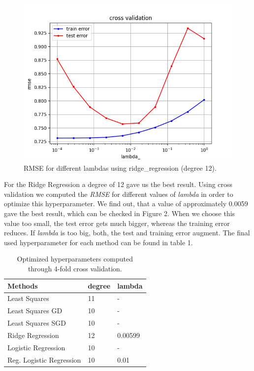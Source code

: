 \documentclass[10pt,conference,compsocconf]{IEEEtran}
\begin{document}
\begin{figure}[htbp]
	\centering
	\includegraphics[width=\columnwidth]{cross_validation_ridge_degree_12.png}
	\caption{RMSE for different lambdas using ridge\_regression (degree 12).}
	\vspace{-3mm}
	\label{fig:crossvalidationridge}
\end{figure}
 For the Ridge Regression a degree of 12 gave us the best result. Using cross validation we computed the \textit{RMSE} for different values of \textit{lambda} in order to optimize this hyperparameter. We find out, that a value of approximately 0.0059 gave the best result, which can be checked in Figure 2. When we choose this value too small, the test error gets much bigger, whereas the training error reduces. If \textit{lambda} is too big, both, the test and training error augment.
 The final used hyperparameter for each method can be found in table 1.\\


\begin{table}[htbp]
	\centering
	\begin{tabular}[c]{|l||l|l|}
		\hline
		Methods&degree&lambda\\
		\hline
		Least Squares& 11 &-\\
		Least Squares GD& 10 & -\\
		Least Squares SGD & 10 &-\\		Ridge Regression&12&0.00599\\
		Logistic Regression & 10&-\\
		Reg. Logistic Regression&10&0.01\\
		\hline
	\end{tabular}
	\caption{Optimized hyperparameters computed\\ through 4-fold cross validation.}
	\label{tab:hyperpam}
\end{table}
\end{document}
